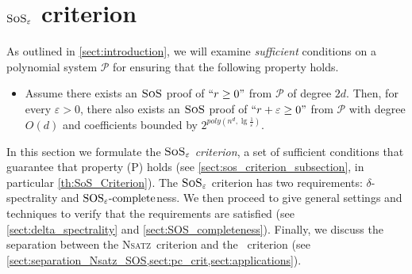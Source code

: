 \documentclass[11pt]{article}
\newcommand{\sos}{\text{\sc{SoS}}}
\newcommand{\Nsatz}{\textsc{Nsatz}}
\newcommand{\1}{\textbf{1}}
\newcommand{\SOSe}{\rm{SOS}_\varepsilon\text{-complete}}
\begin{document}
\section[SoS epsilon criterion]{$\sos_\varepsilon$ criterion}\label{sect:sos-criterion}
As outlined in \cref{sect:introduction}, we will examine \emph{sufficient} conditions on a polynomial system \(\mathcal{P}\) for ensuring that the following property holds.
\begin{itemize}[label=$(\rm{P})$]
    \item \label{prob:1} Assume there exists an $\sos$ proof of $``r \geq 0"$ from $\mathcal{P}$ of degree $2d$. Then, for every $\varepsilon>0$, there also exists an $\sos$ proof of $``r +\varepsilon \geq 0"$ from $\mathcal{P}$ with degree $O(d)$ and coefficients bounded by $2^{poly(n^d,\lg \frac{1}{\varepsilon})}$.
\end{itemize}


In this section we formulate the \emph{$\sos_{\varepsilon}$ criterion}, a set of sufficient conditions that guarantee that property (\textsc{P}) holds (see \cref{sect:sos_criterion_subsection}, in particular \cref{th:SoS_Criterion}). The $\sos_{\varepsilon}$ criterion has two requirements: $\delta$-spectrality and $\SOSe$ness. We then proceed to give general settings and techniques to verify that the requirements are satisfied (see \cref{sect:delta_spectrality} and \cref{sect:SOS_completeness}). Finally, we discuss the separation between the \Nsatz\ criterion and the \sos\ criterion (see \cref{sect:separation_Nsatz_SOS,sect:pc_crit,sect:applications}).
\end{document}
